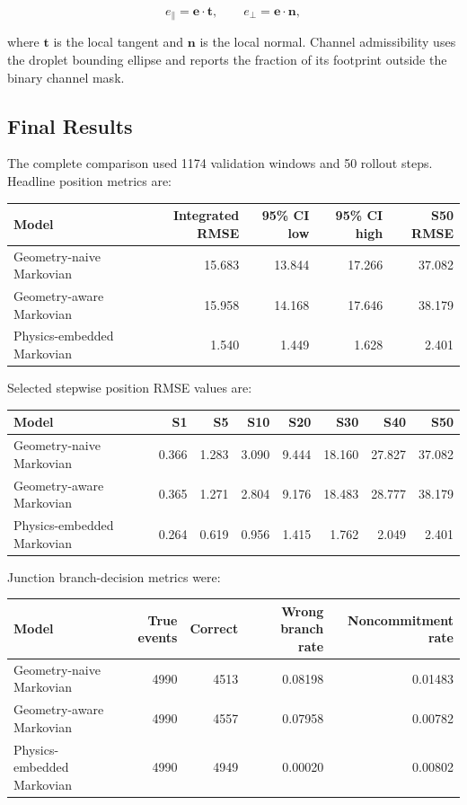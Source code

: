 \[
e_\parallel = \mathbf{e}\cdot\mathbf{t},
\qquad
e_\perp = \mathbf{e}\cdot\mathbf{n},
\]

where \(\mathbf{t}\) is the local tangent and \(\mathbf{n}\) is the local
normal.  Channel admissibility uses the droplet bounding ellipse and reports
the fraction of its footprint outside the binary channel mask.

\subsection{Final Results}

The complete comparison used 1174 validation windows and 50 rollout steps.
Headline position metrics are:

\begin{longtable}{@{}lrrrr@{}}
\toprule
Model & Integrated RMSE & 95\% CI low & 95\% CI high & S50 RMSE \\
\midrule
Geometry-naive Markovian & 15.683 & 13.844 & 17.266 & 37.082 \\
Geometry-aware Markovian & 15.958 & 14.168 & 17.646 & 38.179 \\
Physics-embedded Markovian & 1.540 & 1.449 & 1.628 & 2.401 \\
\bottomrule
\end{longtable}

Selected stepwise position RMSE values are:

\begin{longtable}{@{}lrrrrrrr@{}}
\toprule
Model & S1 & S5 & S10 & S20 & S30 & S40 & S50 \\
\midrule
Geometry-naive Markovian & 0.366 & 1.283 & 3.090 & 9.444 & 18.160 & 27.827 & 37.082 \\
Geometry-aware Markovian & 0.365 & 1.271 & 2.804 & 9.176 & 18.483 & 28.777 & 38.179 \\
Physics-embedded Markovian & 0.264 & 0.619 & 0.956 & 1.415 & 1.762 & 2.049 & 2.401 \\
\bottomrule
\end{longtable}

Junction branch-decision metrics were:

\begin{longtable}{@{}lrrrr@{}}
\toprule
Model & True events & Correct & Wrong branch rate & Noncommitment rate \\
\midrule
Geometry-naive Markovian & 4990 & 4513 & 0.08198 & 0.01483 \\
Geometry-aware Markovian & 4990 & 4557 & 0.07958 & 0.00782 \\
Physics-embedded Markovian & 4990 & 4949 & 0.00020 & 0.00802 \\
\bottomrule
\end{longtable}

